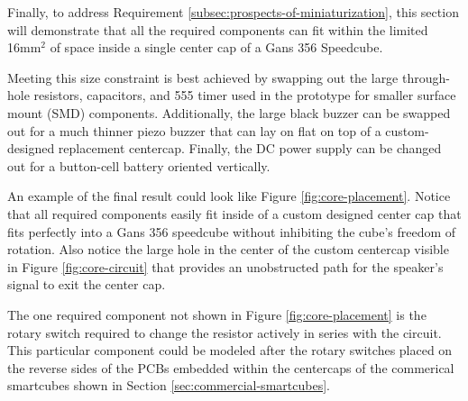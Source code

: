 Finally, to address Requirement
\ref{subsec:prospects-of-miniaturization}, this section will
demonstrate that all the required components can fit within the limited
16mm$^2$ of space inside a single center cap of a Gans 356 Speedcube.

Meeting this size constraint is best achieved by swapping out the large
through-hole resistors, capacitors, and 555 timer used in the prototype
for smaller surface mount (SMD) components. Additionally, the large
black buzzer can be swapped out for a much thinner piezo buzzer that
can lay on flat on top of a custom-designed replacement centercap.
Finally, the DC power supply can be changed out for a button-cell
battery oriented vertically.

An example of the final result could look like Figure
\ref{fig:core-placement}. Notice that all required components easily
fit inside of a custom designed center cap that fits perfectly into a
Gans 356 speedcube without inhibiting the cube's freedom of rotation.
Also notice the large hole in the center of the custom centercap
visible in Figure \ref{fig:core-circuit} that provides an unobstructed
path for the speaker's signal to exit the center cap.

The one required component not shown in Figure \ref{fig:core-placement}
is the rotary switch required to change the resistor actively in series
with the circuit. This particular component could be modeled after the
rotary switches placed on the reverse sides of the PCBs embedded within
the centercaps of the commerical smartcubes shown in Section
\ref{sec:commercial-smartcubes}.

